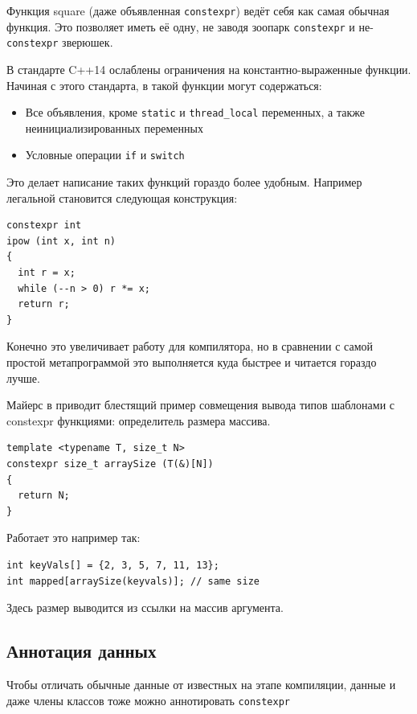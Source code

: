 \documentclass[a4paper,12pt,oneside]{book}
\begin{document}
Функция square (даже объявленная \lstinline!constexpr!) ведёт себя как самая обычная функция. Это позволяет иметь её одну, не заводя зоопарк \lstinline!constexpr! и не-\lstinline!constexpr! зверюшек.

В стандарте C++14 ослаблены ограничения на константно-выраженные функции. Начиная с этого стандарта, в такой функции могут содержаться:

\begin{itemize}
\item Все объявления, кроме \lstinline!static! и \lstinline!thread_local! переменных, а также неинициализированных переменных
\item Условные операции \lstinline!if! и \lstinline!switch!
\end{itemize}

Это делает написание таких функций гораздо более удобным. Например легальной становится следующая конструкция:

\begin{lstlisting}
constexpr int 
ipow (int x, int n) 
{ 
  int r = x;
  while (--n > 0) r *= x;
  return r;
}
\end{lstlisting}

Конечно это увеличивает работу для компилятора, но в сравнении с самой простой метапрограммой это выполняется куда быстрее и читается гораздо лучше.

Майерс в \cite{effmoderncpp} приводит блестящий пример совмещения вывода типов шаблонами с constexpr функциями: определитель размера массива.

\begin{lstlisting}
template <typename T, size_t N>
constexpr size_t arraySize (T(&)[N]) 
{
  return N;
}
\end{lstlisting}

Работает это например так:

\begin{lstlisting}
int keyVals[] = {2, 3, 5, 7, 11, 13};
int mapped[arraySize(keyvals)]; // same size
\end{lstlisting}

Здесь размер выводится из ссылки на массив аргумента.

\subsection{Аннотация данных}\label{Constexpr:data}

Чтобы отличать обычные данные от известных на этапе компиляции, данные и даже члены классов тоже можно аннотировать \lstinline!constexpr!
\end{document}
